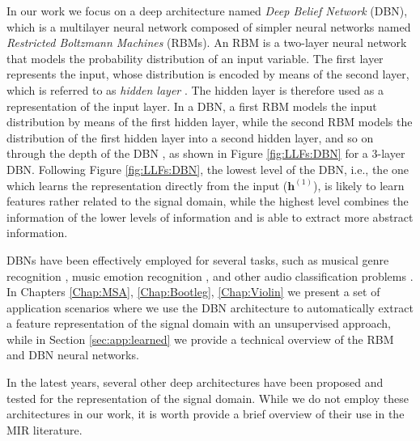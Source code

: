 In our work we focus on a deep architecture named \textit{Deep Belief Network} (DBN), which is a multilayer neural network composed of simpler neural networks named \textit{Restricted Boltzmann Machines} (RBMs).
An RBM is a two-layer neural network that models the probability distribution of an input variable. The first layer represents the input, whose distribution is encoded by means of the second layer, which is referred to as \textit{hidden layer} \cite{Bengio2009}. The hidden layer is therefore used as a representation of the input layer.
In a DBN, a first RBM models the input distribution by means of the first hidden layer, while the second RBM models the distribution of the first hidden layer into a second hidden layer, and so on through the depth of the DBN \cite{Hinton2006}, as shown in Figure \ref{fig:LLFs:DBN} for a 3-layer DBN. Following Figure \ref{fig:LLFs:DBN}, the lowest level of the DBN, i.e., the one which learns the representation directly from the input ($\mathbf{h}^{(1)}$), is likely to learn features rather related to the signal domain, while the highest level combines the information of the lower levels of information and is able to extract more abstract information.

DBNs have been effectively employed for several tasks, such as musical genre recognition \cite{Hamel2010}, music emotion recognition \cite{Schmidt2011}, and other audio classification problems \cite{Humphrey2013}. In Chapters \ref{Chap:MSA}, \ref{Chap:Bootleg}, \ref{Chap:Violin} we present a set of application scenarios where we use the DBN architecture to automatically extract a feature representation of the signal domain with an unsupervised approach, while in Section \ref{sec:app:learned} we provide a technical overview of the RBM and DBN neural networks.

In the latest years, several other deep architectures have been proposed and tested for the representation of the signal domain. While we do not employ these architectures in our work, it is worth provide a brief overview of their use in the MIR literature.

